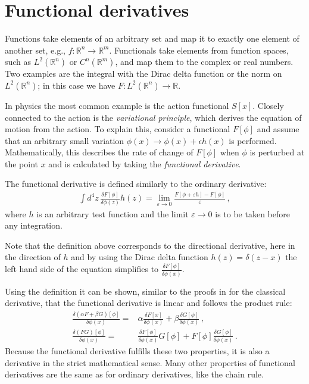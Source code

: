 \documentclass[prd,%
,superscriptaddress,%
nofootinbib,%
tightenlines ]{revtex4}
\begin{document}
\appendix
\section{Functional derivatives}
\label{A:1}
Functions take elements of an arbitrary set and map it to exactly one element of another set, e.g., $f\colon \mathbb{R}^n \rightarrow \mathbb{R}^m$. 
Functionals take elements from function spaces, such as $L^2(\mathbb{R}^n)$ or $C^n(\mathbb{R}^m)$, and map them to the complex or real numbers. 
Two examples are the integral with the Dirac delta function or the norm on $L^2(\mathbb{R}^n)$; 
in this case we have $F\colon L^2(\mathbb{R}^n)\to \mathbb{R}$. 

In physics the most common example is the action functional $S[x]$. 
Closely connected to the action is the \emph{variational principle}, which derives the equation of motion from the action. 
To explain this, consider a functional $F[\phi]$ and assume that an arbitrary small variation $\phi(x) \to \phi(x) + \epsilon h(x)$ is performed. 
Mathematically, this describes the rate of change of $F[\phi]$ when $\phi$ is perturbed at the point $x$ and is calculated by taking the \emph{functional derivative}. 

The functional derivative is defined similarly to the ordinary derivative:
\begin{align}
	 \int d^4 z\, \frac{\delta F[\phi]}{\delta \phi(z)} h(z) 
	 =
	 \lim \limits_{\varepsilon \rightarrow 0}\frac{F[\phi+\varepsilon h]-F[\phi]}{\varepsilon}\,,
\end{align}
where $h$ is an arbitrary test function and the limit $\varepsilon \to 0 $ is to be taken before any integration. 

Note that the definition above corresponds to the directional derivative, here in the direction of $h$ and by using the Dirac delta function
$h(z)=\delta(z-x)$
the left hand side of the equation simplifies to
$\frac{\delta F[\phi]}{\delta \phi(x)}$.

Using the definition it can be shown, similar to the proofs in for the classical derivative, that the functional derivative is linear and follows the product rule:
\begin{align}
	\frac{\delta(\alpha F+\beta G)[\phi]}{\delta \phi(x)}
	={}&
	\alpha \frac{\delta F[x]}{\delta \phi(x)}+\beta \frac{\delta G[\phi]}{\delta \phi(x)}\,,
	\\
	\frac{\delta( F G)[\phi]}{\delta \phi(x)}
	={}&
	\frac{\delta F[\phi]}{\delta \phi(x)}G[\phi]+ F[\phi]\frac{\delta G[\phi]}{\delta \phi(x)}\,.
\end{align}
Because the functional derivative fulfills these two properties, it is also a derivative in the strict mathematical sense.
Many other properties of functional derivatives are the same as for ordinary derivatives, like the chain rule.
\end{document}
